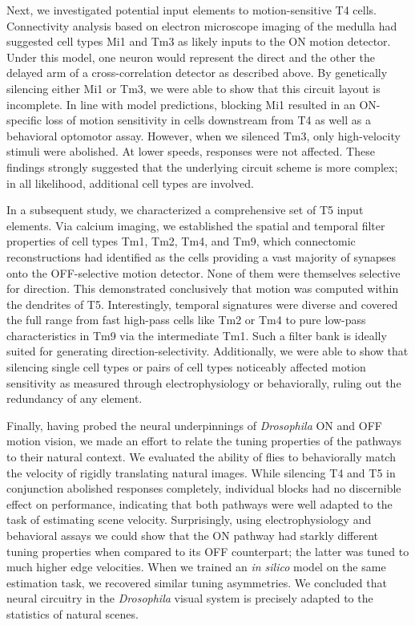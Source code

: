 Next, we investigated potential input elements to motion-sensitive T4 cells. Connectivity analysis based on electron microscope imaging of the medulla had suggested cell types Mi1 and Tm3 as likely inputs to the ON motion detector. Under this model, one neuron would represent the direct and the other the delayed arm of a cross-correlation detector as described above. By genetically silencing either Mi1 or Tm3, we were able to show that this circuit layout is incomplete. In line with model predictions, blocking Mi1 resulted in an ON-specific loss of motion sensitivity in cells downstream from T4 as well as a behavioral optomotor assay. However, when we silenced Tm3, only high-velocity stimuli were abolished. At lower speeds, responses were not affected. These findings strongly suggested that the underlying circuit scheme is more complex; in all likelihood, additional cell types are involved.

In a subsequent study, we characterized a comprehensive set of T5 input elements. Via calcium imaging, we established the spatial and temporal filter properties of cell types Tm1, Tm2, Tm4, and Tm9, which connectomic reconstructions had identified as the cells providing a vast majority of synapses onto the OFF-selective motion detector. None of them were themselves selective for direction. This demonstrated conclusively that motion was computed within the dendrites of T5. Interestingly, temporal signatures were diverse and covered the full range from fast high-pass cells like Tm2 or Tm4 to pure low-pass characteristics in Tm9 via the intermediate Tm1. Such a filter bank is ideally suited for generating direction-selectivity. Additionally, we were able to show that silencing single cell types or pairs of cell types noticeably affected motion sensitivity as measured through electrophysiology or behaviorally, ruling out the redundancy of any element.

Finally, having probed the neural underpinnings of \textit{Drosophila} ON and OFF motion vision, we made an effort to relate the tuning properties of the pathways to their natural context. We evaluated the ability of flies to behaviorally match the velocity of rigidly translating natural images. While silencing T4 and T5 in conjunction abolished responses completely, individual blocks had no discernible effect on performance, indicating that both pathways were well adapted to the task of estimating scene velocity. Surprisingly, using electrophysiology and behavioral assays we could show that the ON pathway had starkly different tuning properties when compared to its OFF counterpart; the latter was tuned to much higher edge velocities. When we trained an \textit{in silico} model on the same estimation task, we recovered similar tuning asymmetries. We concluded that neural circuitry in the \textit{Drosophila} visual system is precisely adapted to the statistics of natural scenes.